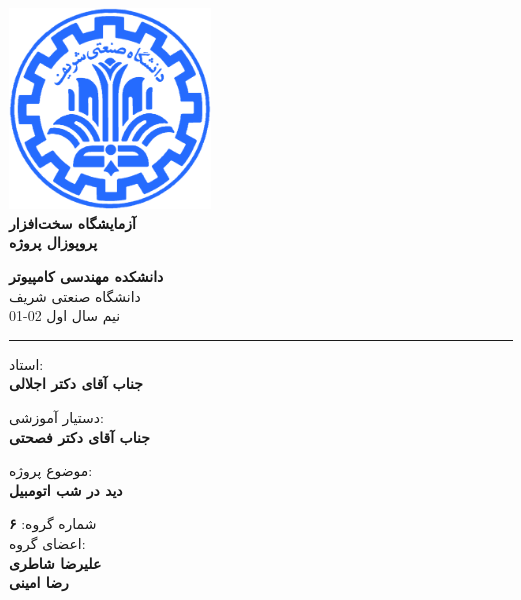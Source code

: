\documentclass[12pt]{article}
\begin{document}
\begin{titlepage}
\begin{center}
        
\vspace*{0.7cm}

\includegraphics[width=0.4\textwidth]{sharif1.png}\\
\vspace{0.5cm}
\textbf{ \Huge{\emph ‌آزمایشگاه سخت‌افزار} }\\
\vspace{0.5cm}
\textbf{ \Large{ پروپوزال پروژه} }
\vspace{0.2cm}
       
 
      \large \textbf{دانشکده مهندسی کامپیوتر}\\\vspace{0.2cm}
    \large   دانشگاه صنعتی شریف\\\vspace{0.2cm}
       \large   ﻧﯿﻢ سال اول 02-01 \\\vspace{0.2cm}
      \noindent\rule[1ex]{\linewidth}{1pt}
استاد:\\
    \textbf{{جناب آقای دکتر اجلالی}}


دستیار آموزشی:\\
\textbf{{جناب آقای دکتر فصحتی}}

    \vspace{0.25cm}
    
    موضوع پروژه:\\
    
    \textbf{{دید در شب اتومبیل}}
    
    \vspace{0.35cm}
    
    
        شماره گروه:
    \textbf{{۶}}\\
    
اعضای گروه:\\

    \textbf{{علیرضا شاطری}}
    \\
   
    \textbf{{رضا امینی}}
\end{center}
\end{titlepage}
\end{document}
